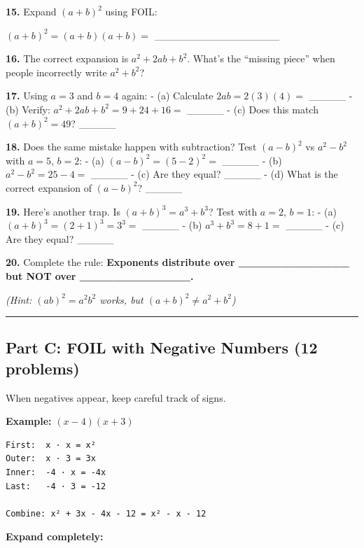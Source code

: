 \documentclass[
  11pt,
]{article}
\begin{document}
\textbf{15.} Expand \((a + b)^2\) using FOIL:

\((a + b)^2 = (a + b)(a + b) ={}\) \_\_\_\_\_\_\_\_\_\_\_\_\_\_\_\_\_

\textbf{16.} The correct expansion is \(a^2 + 2ab + b^2\). What's the
``missing piece'' when people incorrectly write \(a^2 + b^2\)?

\textbf{17.} Using \(a = 3\) and \(b = 4\) again: - (a) Calculate
\(2ab = 2(3)(4) ={}\) \_\_\_\_\_ - (b) Verify:
\(a^2 + 2ab + b^2 = 9 + 24 + 16 ={}\) \_\_\_\_\_ - (c) Does this match
\((a + b)^2 = 49\)? \_\_\_\_\_

\textbf{18.} Does the same mistake happen with subtraction? Test
\((a - b)^2\) vs \(a^2 - b^2\) with \(a = 5\), \(b = 2\): - (a)
\((a - b)^2 = (5 - 2)^2 ={}\) \_\_\_\_\_ - (b)
\(a^2 - b^2 = 25 - 4 ={}\) \_\_\_\_\_ - (c) Are they equal? \_\_\_\_\_ -
(d) What is the correct expansion of \((a - b)^2\)? \_\_\_\_\_

\textbf{19.} Here's another trap. Is \((a + b)^3 = a^3 + b^3\)? Test
with \(a = 2\), \(b = 1\): - (a) \((a + b)^3 = (2 + 1)^3 = 3^3 ={}\)
\_\_\_\_\_ - (b) \(a^3 + b^3 = 8 + 1 ={}\) \_\_\_\_\_ - (c) Are they
equal? \_\_\_\_\_

\textbf{20.} Complete the rule: \textbf{Exponents distribute over
\_\_\_\_\_\_\_\_\_\_\_\_\_ but NOT over \_\_\_\_\_\_\_\_\_\_\_\_\_.}

\emph{(Hint: \((ab)^2 = a^2b^2\) works, but
\((a + b)^2 \neq a^2 + b^2\))}

\begin{center}\rule{0.5\linewidth}{0.5pt}\end{center}

\hypertarget{part-c-foil-with-negative-numbers-12-problems}{%
\subsection{Part C: FOIL with Negative Numbers (12
problems)}\label{part-c-foil-with-negative-numbers-12-problems}}

When negatives appear, keep careful track of signs.

\textbf{Example:} \((x - 4)(x + 3)\)

\begin{verbatim}
First:  x · x = x²
Outer:  x · 3 = 3x
Inner:  -4 · x = -4x
Last:   -4 · 3 = -12

Combine: x² + 3x - 4x - 12 = x² - x - 12
\end{verbatim}

\textbf{Expand completely:}
\end{document}
